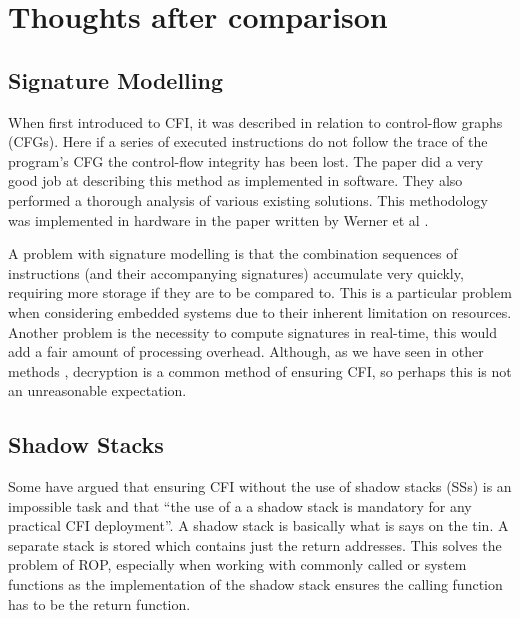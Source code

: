\section{Thoughts after comparison}

\subsection{Signature Modelling}

When first introduced to CFI, it was described in relation to control-flow graphs (CFGs). Here if a series of executed instructions do not follow the trace of the program’s CFG the control-flow integrity has been lost. The paper \cite{Yang2013} did a very good job at describing this method as implemented in software. They also performed a thorough analysis of various existing solutions. This methodology was implemented in hardware in the paper written by Werner et al \cite{Werner2016}.

A problem with signature modelling is that the combination sequences of instructions (and their accompanying signatures) accumulate very quickly, requiring more storage if they are to be compared to. This is a particular problem when considering embedded systems due to their inherent limitation on resources. Another problem is the necessity to compute signatures in real-time, this would add a fair amount of processing overhead. Although, as we have seen in other methods \cite{Davi2015} \cite{Lee2019}, decryption is a common method of ensuring CFI, so perhaps this is not an unreasonable expectation.

\subsection{Shadow Stacks}
Some \cite{Christoulakis2016} have argued that ensuring CFI without the use of shadow stacks (SSs) is an impossible task and that “the use of a a shadow stack is mandatory for any practical CFI deployment”. A shadow stack is basically what is says on the tin. A separate stack is stored which contains just the return addresses. This solves the problem of ROP, especially when working with commonly called or system functions as the implementation of the shadow stack ensures the calling function has to be the return function.

